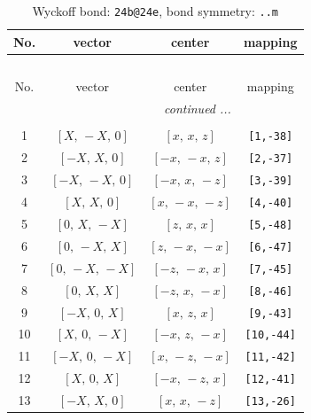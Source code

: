 \documentclass[fleqn,8pt]{jsarticle}
\begin{document}
\begin{longtable}{cccc}
\caption{Wyckoff bond: {\tt 24b@24e}, bond symmetry: {\tt ..m}}
 \\
 \hline \hline
No. & vector & center & mapping \\ \hline \endfirsthead

\multicolumn{3}{l}{\tablename\ \thetable{}} \\
 \hline \hline
No. & vector & center & mapping \\ \hline \endhead

 \hline \hline
\multicolumn{3}{r}{\footnotesize\it continued ...} \\ \endfoot

 \hline \hline
\multicolumn{3}{r}{} \\ \endlastfoot

1 & $\left[ X,\, - X,\, 0 \right]$ & $\left[ x,\, x,\, z \right]$ & {\tt [1,-38]} \\ \hline
2 & $\left[ - X,\, X,\, 0 \right]$ & $\left[ - x,\, - x,\, z \right]$ & {\tt [2,-37]} \\ \hline
3 & $\left[ - X,\, - X,\, 0 \right]$ & $\left[ - x,\, x,\, - z \right]$ & {\tt [3,-39]} \\ \hline
4 & $\left[ X,\, X,\, 0 \right]$ & $\left[ x,\, - x,\, - z \right]$ & {\tt [4,-40]} \\ \hline
5 & $\left[ 0,\, X,\, - X \right]$ & $\left[ z,\, x,\, x \right]$ & {\tt [5,-48]} \\ \hline
6 & $\left[ 0,\, - X,\, X \right]$ & $\left[ z,\, - x,\, - x \right]$ & {\tt [6,-47]} \\ \hline
7 & $\left[ 0,\, - X,\, - X \right]$ & $\left[ - z,\, - x,\, x \right]$ & {\tt [7,-45]} \\ \hline
8 & $\left[ 0,\, X,\, X \right]$ & $\left[ - z,\, x,\, - x \right]$ & {\tt [8,-46]} \\ \hline
9 & $\left[ - X,\, 0,\, X \right]$ & $\left[ x,\, z,\, x \right]$ & {\tt [9,-43]} \\ \hline
10 & $\left[ X,\, 0,\, - X \right]$ & $\left[ - x,\, z,\, - x \right]$ & {\tt [10,-44]} \\ \hline
11 & $\left[ - X,\, 0,\, - X \right]$ & $\left[ x,\, - z,\, - x \right]$ & {\tt [11,-42]} \\ \hline
12 & $\left[ X,\, 0,\, X \right]$ & $\left[ - x,\, - z,\, x \right]$ & {\tt [12,-41]} \\ \hline
13 & $\left[ - X,\, X,\, 0 \right]$ & $\left[ x,\, x,\, - z \right]$ & {\tt [13,-26]} \\ \hline

\end{longtable}
\end{document}
